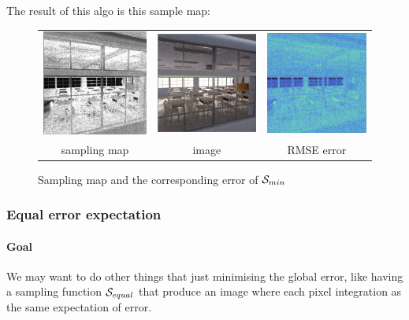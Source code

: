 \documentclass{classeENS}
\begin{document}
The result of this algo is this sample map:
\begin{figure}[H]
    \centering
    \caption{Sampling map and the corresponding error of $\mathcal S_{min}$}
    \begin{tabular}{ccc}
    \includegraphics[width=45mm]{image/without/sm_min.png}
    & \includegraphics[width=45mm]{image/without/normal_min.png}
    & \includegraphics[width=45mm]{image/without/RMSE_min.png} \\
    sampling map & image & RMSE error
    \end{tabular}
\end{figure}

\subsubsection{Equal error expectation}

\paragraph*{Goal} We may want to do other things that just minimising the global error, 
like having a sampling function $\mathcal S_{equal}$ 
that produce an image where each pixel integration as the same expectation of error. 
\end{document}
